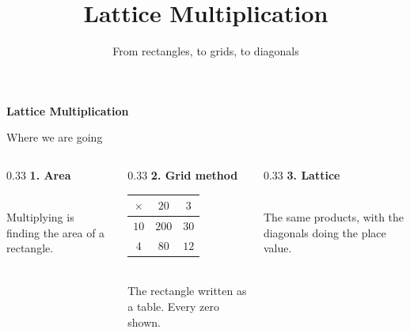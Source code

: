 \documentclass[10pt,aspectratio=169]{beamer}
\title{Lattice Multiplication}
\subtitle{From rectangles, to grids, to diagonals}
\author{}
\date{}
\newcommand{\lgrid}[2]{%
  \foreach \c in {1,...,#1}{%
    \foreach \r in {1,...,#2}{%
      \draw[cellline] ({\c-1},{-\r+1}) rectangle ({\c},{-\r});
      \draw[diagline] ({\c},{-\r+1}) -- ({\c-1},{-\r});}}%
}
\newcommand{\lband}[4]{%
  \begin{scope}
    \clip (0,0) rectangle ({#1},{-#2});
    \fill[#4] ({#3},0) -- ({#3+1},0) -- ({#3-7},-8) -- ({#3-8},-8) -- cycle;
  \end{scope}%
}
\newcommand{\ltop}[2]{\node[headfont] at ({#1-0.5},{0.32}) {#2};}
\newcommand{\lside}[3]{\node[headfont] at ({#1+0.35},{-#2+0.5}) {#3};}
\newcommand{\lcell}[4]{%
  \node at ({#1-0.72},{-#2+0.70}) {\small #3};
  \node at ({#1-0.28},{-#2+0.30}) {\small #4};}
\newcommand{\lleft}[2]{\node[mmred,font=\bfseries] at ({-0.42},{-#1+0.5}) {#2};}
\newcommand{\lbot}[4]{\node[mmred,font=\bfseries] at ({#3-0.5},{-#2-0.42}) {#4};}
\begin{document}
\begin{frame}[plain]
  \vfill
  \centering
  {\Huge\bfseries\color{mmblue} Lattice Multiplication}\\[4pt]
  \vfill
\end{frame}

\begin{frame}{Where we are going}
  \begin{columns}[T]
    \begin{column}{0.33\textwidth}
      \centering
      {\color{mmblue}\bfseries 1. Area}\\[6pt]
      \\[6pt]
      {\footnotesize Multiplying is finding the area of a rectangle.}
    \end{column}
    \begin{column}{0.33\textwidth}
      \centering
      {\color{mmblue}\bfseries 2. Grid method}\\[6pt]
      {\footnotesize
      \begin{tabular}{|c|c|c|}\hline
        $\times$ & $20$ & $3$\\\hline
        $10$ & $200$ & $30$\\\hline
        $4$ & $80$ & $12$\\\hline
      \end{tabular}}\\[6pt]
      {\footnotesize The rectangle written as a table. Every zero shown.}
    \end{column}
    \begin{column}{0.33\textwidth}
      \centering
      {\color{mmblue}\bfseries 3. Lattice}\\[6pt]
      \\[6pt]
      {\footnotesize The same products, with the diagonals doing the place value.}
    \end{column}
  \end{columns}
  \vspace{10pt}
\end{frame}
\end{document}
